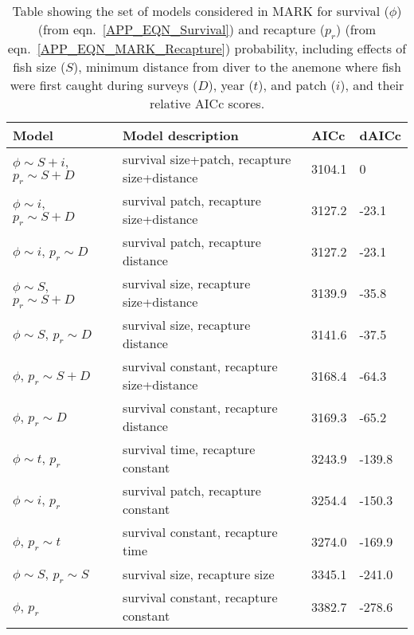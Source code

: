 \documentclass[12pt, oneside]{article}   	%
\begin{document}
\begin{table}[!htbp]
\begin{centering}
\caption{Table showing the set of models considered in MARK for survival ($\phi$) (from eqn.\ \ref{APP_EQN_Survival}) and recapture ($p_r$)  (from eqn.\ \ref{APP_EQN_MARK_Recapture}) probability, including effects of fish size ($S$), minimum distance from diver to the anemone where fish were first caught during surveys ($D$), year ($t$), and patch ($i$), and their relative AICc scores.}\label{APP_TAB_MARKmodels}
\begin{tabular}{|p{1.75in}|p{2.75in}|p{0.75in}|p{0.75in}|}
\hline 
\textbf{Model} & \textbf{Model description} & \textbf{AICc} & \textbf{dAICc} \\ \hline
$\phi \sim S+i$, $p_r \sim S+D$ & survival size+patch, recapture size+distance & 3104.1 & 0 \\ \hline
$\phi \sim i$, $p_r \sim S+D$ & survival patch, recapture size+distance & 3127.2 & -23.1 \\ \hline
$\phi \sim i$, $p_r \sim D$ & survival patch, recapture distance & 3127.2 & -23.1 \\ \hline
$\phi \sim S$, $p_r \sim S+D$ & survival size, recapture size+distance & 3139.9 & -35.8 \\ \hline
$\phi \sim S$, $p_r \sim D$ & survival size, recapture distance & 3141.6 & -37.5 \\ \hline
$\phi$, $p_r \sim S+D$ & survival constant, recapture size+distance & 3168.4 & -64.3 \\ \hline
$\phi$, $p_r \sim D$ & survival constant, recapture distance & 3169.3 & -65.2 \\ \hline
$\phi \sim t$, $p_r$ & survival time, recapture constant & 3243.9 & -139.8 \\ \hline
$\phi \sim i$, $p_r$ & survival patch, recapture constant & 3254.4 & -150.3 \\ \hline
$\phi$, $p_r \sim t$ & survival constant, recapture time & 3274.0 & -169.9 \\ \hline
$\phi \sim S$, $p_r \sim S$ & survival size, recapture size & 3345.1 & -241.0 \\ \hline
$\phi$, $p_r$ & survival constant, recapture constant & 3382.7 & -278.6 \\ \hline
\end{tabular}
\end{centering}
\end{table}
\end{document}
